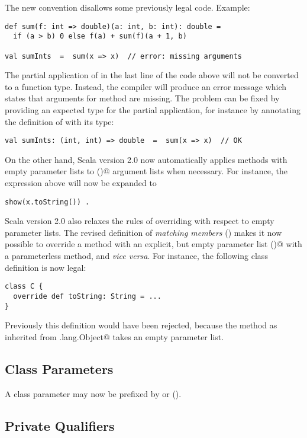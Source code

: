The new convention disallows some previously legal code. Example:
\begin{lstlisting}
def sum(f: int => double)(a: int, b: int): double =
  if (a > b) 0 else f(a) + sum(f)(a + 1, b)

val sumInts  =  sum(x => x)  // error: missing arguments
\end{lstlisting}
The partial application of \lstinline@sum@ in the last line of
the code above will not be converted to a function type. Instead, the
compiler will produce an error message which states that arguments for method
\lstinline@sum@ are missing. The problem can be fixed by providing an
expected type for the partial application, for instance by annotating
the definition of \lstinline@sumInts@ with its type:
\begin{lstlisting}
val sumInts: (int, int) => double  =  sum(x => x)  // OK
\end{lstlisting}

On the other hand, Scala version 2.0 now automatically applies methods
with empty parameter lists to \lstinline@()@ argument lists when
necessary. For instance, the \lstinline@show@ expression above will
now be expanded to
\begin{lstlisting}
show(x.toString()) .
\end{lstlisting}

Scala version 2.0 also relaxes the rules of overriding with respect to
empty parameter lists. The revised definition of {\em matching
members} () makes it now possible to override a
method with an explicit, but empty parameter list \lstinline@()@ with
a parameterless method, and {\em vice versa}. For instance, 
the following class definition is now legal:
\begin{lstlisting}
class C {
  override def toString: String = ...
}
\end{lstlisting}
Previously this definition would have been rejected, because the
\lstinline@toString@ method as inherited from
\lstinline@java.lang.Object@ takes an empty parameter list.  

\subsection*{Class Parameters}

A class parameter may now be prefixed by \lstinline@val@ or
\lstinline@var@ (). 

\subsection*{Private Qualifiers}

